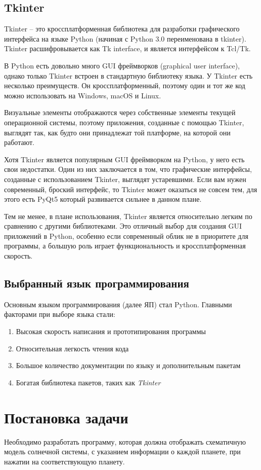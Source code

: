 \documentclass[11pt,a4paper]{report}
\begin{document}
\subsection{Tkinter}
Tkinter – это кроссплатформенная библиотека для разработки графического интерфейса на языке Python (начиная с Python 3.0 переименована в tkinter). Tkinter расшифровывается как Tk interface, и является интерфейсом к Tcl/Tk.

В Python есть довольно много GUI фреймворков (graphical user interface), однако только Tkinter встроен в стандартную библиотеку языка. У Tkinter есть несколько преимуществ. Он кроссплатформенный, поэтому один и тот же код можно использовать на Windows, macOS и Linux.

Визуальные элементы отображаются через собственные элементы текущей операционной системы, поэтому приложения, созданные с помощью Tkinter, выглядят так, как будто они принадлежат той платформе, на которой они работают.

Хотя Tkinter является популярным GUI фреймворком на Python, у него есть свои недостатки. Один из них заключается в том, что графические интерфейсы, созданные с использованием Tkinter, выглядят устаревшими. Если вам нужен современный, броский интерфейс, то Tkinter может оказаться не совсем тем, для этого есть PyQt5 который развивается сильнее в данном плане.

Тем не менее, в плане использования, Tkinter является относительно легким по сравнению с другими библиотеками. Это отличный выбор для создания GUI приложений в Python, особенно если современный облик не в приоритете для программы, а большую роль играет функциональность и кроссплатформенная скорость.

\subsection{Выбранный язык программирования}
Основным языком программирования (далее ЯП) стал Python. Главными факторами при выборе языка стали:
\begin{enumerate}
    \item Высокая скорость написания и прототипирования программы
    \item Относительная легкость чтения кода 
    \item Большое количество документации по языку и дополнительным пакетам
    \item Богатая библиотека пакетов, таких как \textit{Tkinter} 
\end{enumerate} 
\section{Постановка задачи}
Необходимо разработать программу, которая  должна отображать схематичную модель солнечной системы, с указанием информации о каждой  планете, при нажатии на соответствующую планету. 
\end{document}
